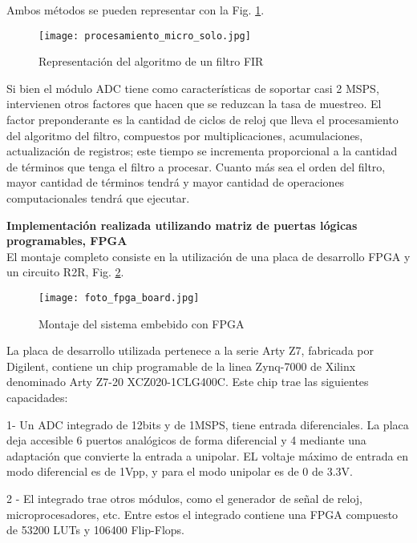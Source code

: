 \documentclass[informe.tex]{subfiles}
\begin{document}
Ambos métodos se pueden representar con la Fig. \ref{fig:disenio_y_construccion:stm32:algoritmo}.\\

\begin{figure}[h]
	\centering
	\texttt{[image: procesamiento\_micro\_solo.jpg]}	
	\caption{Representación del algoritmo de un filtro FIR}
	\label{fig:disenio_y_construccion:stm32:algoritmo}
	\end{figure}


Si bien el módulo ADC tiene como características de soportar casi 2 MSPS, intervienen otros factores que hacen que se reduzcan la tasa de muestreo. El factor preponderante es la cantidad de ciclos de reloj que lleva el procesamiento del algoritmo del filtro, compuestos por multiplicaciones, acumulaciones, actualización de registros; este tiempo se incrementa proporcional a la cantidad de términos que tenga el filtro a procesar. Cuanto más sea el orden del filtro, mayor cantidad de términos tendrá y mayor cantidad de operaciones computacionales tendrá que ejecutar.\newpage


\textbf{Implementación realizada utilizando matriz de puertas lógicas programables, FPGA}\\

El montaje completo consiste en la utilización de una placa de desarrollo FPGA y un circuito R2R, Fig. \ref{fig:disenio_y_construccion:fpga:board}.
\begin{figure}
	\centering
	\texttt{[image: foto\_fpga\_board.jpg]}	
	\caption{Montaje del sistema embebido con FPGA}
	\label{fig:disenio_y_construccion:fpga:board}
	\end{figure}
La placa de desarrollo utilizada pertenece a la serie Arty Z7, fabricada por Digilent, contiene un chip programable de la linea Zynq-7000 de Xilinx denominado Arty Z7-20 XCZ020-1CLG400C. Este chip trae las siguientes capacidades:\newline

1- Un ADC integrado de 12bits y de 1MSPS, tiene entrada diferenciales. La placa deja accesible 6 puertos analógicos de forma diferencial y 4 mediante una adaptación que convierte la entrada a unipolar. EL voltaje máximo de entrada en modo diferencial es de 1Vpp, y para el modo unipolar es de 0 de 3.3V.\newline 
	
2 - El integrado trae otros módulos, como el generador de señal de reloj, microprocesadores, etc. Entre estos el integrado contiene una FPGA compuesto de 53200 LUTs y 106400 Flip-Flops.\\\\
\end{document}
